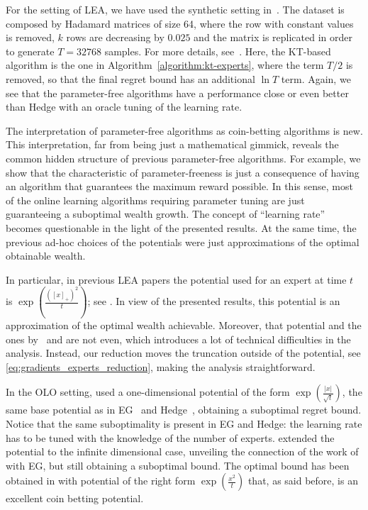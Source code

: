 For the setting of \ac{LEA}, we have used the synthetic setting
in~\cite{Chaudhuri-Freund-Hsu-2009}. The dataset is composed by Hadamard
matrices of size 64, where the row with constant values is removed, $k$ rows
are decreasing by $0.025$ and the matrix is replicated in order to generate
$T=32768$ samples. For more details, see~\cite{Chaudhuri-Freund-Hsu-2009}.
Here, the KT-based algorithm is the one in
Algorithm~\ref{algorithm:kt-experts}, where the term $T/2$ is removed, so that
the final regret bound has an additional $\ln T$ term.  Again, we see that the
parameter-free algorithms have a performance close or even better than Hedge
with an oracle tuning of the learning rate.

The interpretation of parameter-free algorithms as coin-betting algorithms is
new. This interpretation, far from being just a mathematical gimmick, reveals
the common hidden structure of previous parameter-free algorithms. For example,
we show that the characteristic of parameter-freeness is just a consequence of
having an algorithm that guarantees the maximum reward possible.  In this
sense, most of the online learning algorithms requiring parameter tuning are
just guaranteeing a suboptimal wealth growth. The concept of ``learning rate''
becomes questionable in the light of the presented results.  At the same time,
the previous ad-hoc choices of the potentials were just approximations of the
optimal obtainable wealth.

In particular, in previous \ac{LEA} papers the potential used for an expert at
time $t$ is $\exp \left(\tfrac{([x]_+)^2}{t} \right)$; see
\citep{Chaudhuri-Freund-Hsu-2009, Luo-Schapire-2014, Luo-Schapire-2015}. In
view of the presented results, this potential is an approximation of the
optimal wealth achievable. Moreover, that potential and the ones
by~\citet{Chernov-Vovk-2010} and \cite{Koolen-van-Erven-2015} are not even,
which introduces a lot of technical difficulties in the analysis. Instead, our
reduction moves the truncation outside of the potential, see
\eqref{eq:gradients_experts_reduction}, making the analysis straightforward.

In the \ac{OLO} setting, \citet{Streeter-McMahan-2012} used a one-dimensional
potential of the form $\exp \left(\tfrac{|x|}{\sqrt{t}}\right)$, the same base
potential as in \ac{EG}~\citep{Kivinen-Warmuth-1997} and
Hedge~\cite{Freund-Schapire-1997}, obtaining a suboptimal regret bound. Notice
that the same suboptimality is present in \ac{EG} and Hedge: the learning rate
has to be tuned with the knowledge of the number of experts.
\citet{Orabona-2013} extended the potential to the infinite dimensional case,
unveiling the connection of the work of \citet{Streeter-McMahan-2012} with
\ac{EG}, but still obtaining a suboptimal bound. The optimal bound has been
obtained in \citet{McMahan-Orabona-2014} with potential of the right form $\exp
\left(\frac{x^2}{t}\right)$ that, as said before, is an excellent coin betting
potential.

